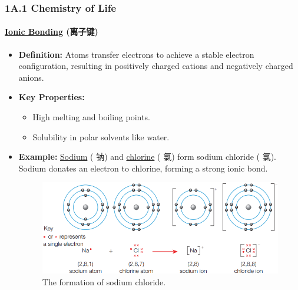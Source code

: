 
\subsubsection{1A.1 Chemistry of Life}
\paragraph{\underline{Ionic Bonding} (离子键)}
\begin{itemize}
    \item \textbf{Definition:} Atoms transfer electrons to achieve a stable electron configuration, resulting in positively
    charged cations and negatively charged anions.
    \item \textbf{Key Properties:}
    \begin{itemize}
        \item High melting and boiling points.
        \item Solubility in polar solvents like water.
    \end{itemize}
    \item \textbf{Example:} \underline{Sodium} ( 钠) and \underline{chlorine} ( 氯) form sodium chloride ( 氯).
    Sodium donates an electron to chlorine, forming a strong ionic bond.
    \begin{figure}[H]
        \centering
        \includegraphics[scale=0.8]{Biology/1A/Images/1A-1-1.png}
        \caption{The formation of sodium chloride.}
    \end{figure}
\end{itemize}

